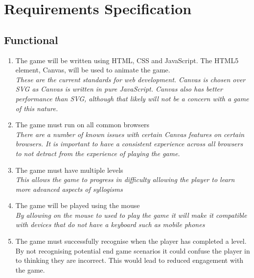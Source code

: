 \documentclass[12pt,a4paper]{report}
\begin{document}
{\let\clearpage\relax \chapter{Requirements Specification}}
   \section{Functional}
   \begin{enumerate}[label*=\thesection .\arabic*]
            \item The game will be written using HTML, CSS and JavaScript. The HTML5 element, Canvas, will be used to animate the game.\\
            \textit{These are the current standards for web development. Canvas is chosen over SVG as Canvas is written in pure JavaScript. Canvas also has better performance than SVG, although that likely will not be a concern with a game of this nature. }
            \item The game must run on all common browsers\\
            \textit{There are a number of known issues with certain Canvas features on certain browsers. It is important to have a consistent experience across all browsers to not detract from the experience of playing the game. }
            \item The game must have multiple levels\\
            \textit{This allows the game to progress in difficulty allowing the player to learn more advanced aspects of syllogisms}
            \item The game will be played using the mouse\\
            \textit{By allowing on the mouse to used to play the game it will make it compatible with devices that do not have a keyboard such as mobile phones}
            \item The game must successfully recognise when the player has completed a level.\\
            {By not recognising potential end game scenarios it could confuse the player in to thinking they are incorrect. This would lead to reduced engagement with the game.}
        \end{enumerate}
\end{document}
